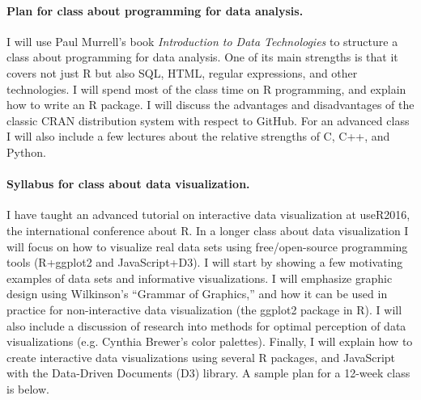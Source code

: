 \documentclass{article}
\begin{document}


\paragraph{Plan for class about programming for data analysis.} I will
use Paul Murrell's book \emph{Introduction to Data Technologies} to
structure a class about programming for data analysis. One of its main
strengths is that it covers not just R but also SQL, HTML, regular
expressions, and other technologies. I will spend most of the class
time on R programming, and explain how to write an R package. I will
discuss the advantages and disadvantages of the classic CRAN
distribution system with respect to GitHub. For an advanced class I
will also include a few lectures about the relative strengths of C,
C++, and Python.

\paragraph{Syllabus for class about data visualization.} I have taught
an advanced tutorial on interactive data visualization at useR2016,
the international conference about R. In a longer class about data
visualization I will focus on how to visualize real data sets using
free/open-source programming tools (R+ggplot2 and JavaScript+D3). I
will start by showing a few motivating examples of data sets and
informative visualizations. I will emphasize graphic design using
Wilkinson's ``Grammar of Graphics,'' and how it can be used in
practice for non-interactive data visualization (the ggplot2 package
in R). I will also include a discussion of research into methods for
optimal perception of data visualizations (e.g. Cynthia Brewer's color
palettes). Finally, I will explain how to create interactive data
visualizations using several R packages, and JavaScript with the
Data-Driven Documents (D3) library. A sample plan for a 12-week class
is below.
\end{document}
